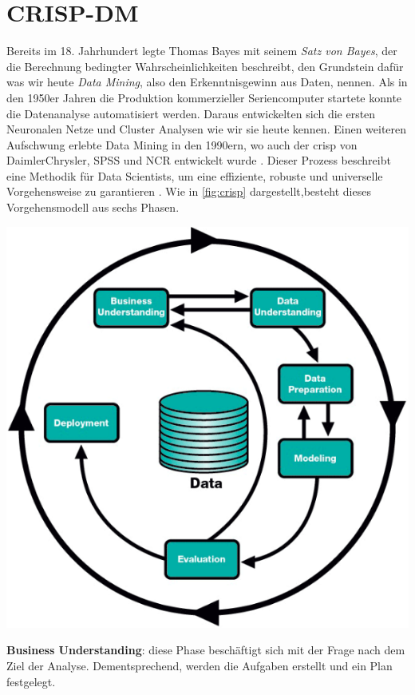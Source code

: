 \documentclass[
    12pt, %
    DIV10,
    ngerman, %
    a4paper, %
    oneside, %
    titlepage, %
    parskip=half, %
    headings=normal, %
    listof=totoc, %
    bibliography=totoc, %
    index=totoc, %
    captions=tableheading, %
    final %
]{scrreprt}
\begin{document}
\section{CRISP-DM}
\label{sec:crisp}
Bereits im 18. Jahrhundert legte Thomas Bayes mit seinem \emph{Satz von Bayes}, der die Berechnung bedingter Wahrscheinlichkeiten beschreibt, den Grundstein dafür was wir heute \emph{Data Mining}, also den Erkenntnisgewinn aus Daten, nennen. Als in den 1950er Jahren die Produktion kommerzieller Seriencomputer startete konnte die Datenanalyse automatisiert werden. Daraus entwickelten sich die ersten Neuronalen Netze und Cluster Analysen wie wir sie heute kennen. Einen weiteren Aufschwung erlebte Data Mining in den 1990ern, wo auch der \ac{crisp} von DaimlerChrysler, SPSS und NCR entwickelt wurde \parencite{SmartVisionEurop}.
Dieser Prozess beschreibt eine Methodik für Data Scientists, um eine effiziente, robuste und universelle Vorgehensweise zu garantieren \parencite{chapman1999crisp}. Wie in \ref{fig:crisp} dargestellt,besteht dieses Vorgehensmodell aus sechs Phasen.
\begin{center}
\includegraphics[scale=0.5]{img/crisp.png}
\label{fig:crisp}
\end{center}
\textbf{Business Understanding}: diese Phase beschäftigt sich mit der Frage nach dem Ziel der Analyse. Dementsprechend, werden die Aufgaben erstellt und ein Plan festgelegt.\\
\end{document}
